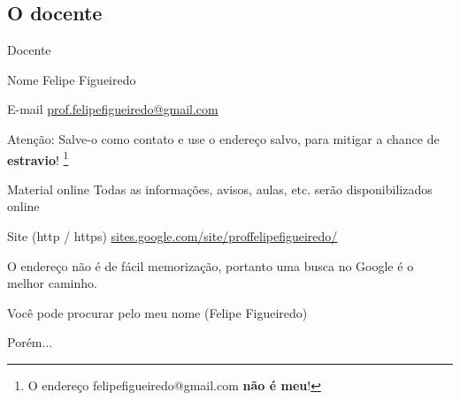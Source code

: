 \documentclass{beamer}
\begin{document}
\subsection{O docente}

\begin{frame}{Docente}
  \begin{block}{Nome}
    Felipe Figueiredo
  \end{block}
  \begin{block}{E-mail}
    \url{prof.felipefigueiredo@gmail.com}

    \bigskip
    \small
    \alert{Atenção:} Salve-o como contato e use o endereço salvo, para mitigar a chance de {\bf estravio}!
    \footnote{O endereço felipefigueiredo@gmail.com {\bf não é meu}!}
  \end{block}
\end{frame}

\begin{frame}{Material online}
  \footnotesize
  Todas as informações, avisos, aulas, etc. serão disponibilizados online

  \bigskip
  \begin{block}{Site (http / https)}
    \small
    \url{sites.google.com/site/proffelipefigueiredo/}
  \end{block}

  \bigskip
  O endereço não é de fácil memorização, portanto uma busca no Google é o melhor caminho.

  \bigskip
  Você pode procurar pelo meu nome (Felipe Figueiredo)

  \bigskip
  \bigskip
  \begin{center}
    \normalsize
    Porém...
  \end{center}
\end{frame}
\end{document}
